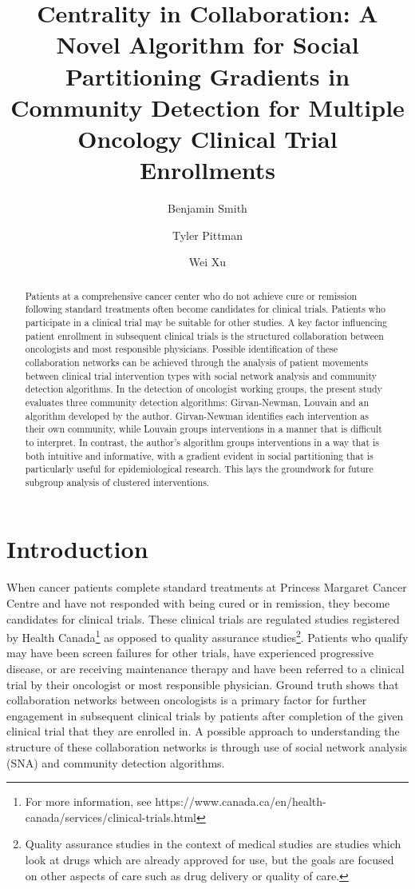 \documentclass{article}
\title{Centrality in Collaboration: A Novel Algorithm for Social Partitioning Gradients in Community Detection for Multiple Oncology Clinical Trial Enrollments}
\author[1]{Benjamin Smith\orcidlink{0009-0007-2206-0177}}
\author[2]{Tyler Pittman\orcidlink{0000-0002-5013-6980}}
\author[1,2]{Wei Xu\orcidlink{0000-0002-0257-8856}}
\affil[1]{University of Toronto, Toronto, Canada}
\affil[2]{University Health Network, Toronto, Canada}
\date{} %
\begin{document}
\maketitle

\begin{abstract}
Patients at a comprehensive cancer center who do not achieve cure
or remission following standard treatments often become candidates for
clinical trials. Patients who participate in a clinical trial may be
suitable for other studies. A key factor influencing patient enrollment
in subsequent clinical trials is the structured collaboration between
oncologists and most responsible physicians. Possible identification of
these collaboration networks can be achieved through the analysis of patient
movements between clinical trial intervention types with
social network analysis and community detection algorithms. In the detection of oncologist working groups, the
present study evaluates three community detection algorithms:
Girvan-Newman, Louvain and an algorithm developed by the author.
Girvan-Newman identifies each intervention as their own community, while
Louvain groups interventions in a manner that is difficult to interpret.
In contrast, the author's algorithm groups interventions in a way that
is both intuitive and informative, with a gradient evident in social partitioning that is particularly useful for epidemiological research. This lays the groundwork for future
subgroup analysis of clustered interventions.
\end{abstract}
\newpage
\section{Introduction}\label{introduction}

When cancer patients complete standard treatments at Princess Margaret
Cancer Centre and have not responded with being cured or in remission,
they become candidates for clinical trials. These clinical trials are
regulated studies registered by Health Canada\footnote{For more
  information, see
  https://www.canada.ca/en/health-canada/services/clinical-trials.html}
as opposed to quality assurance studies\footnote{Quality assurance
  studies in the context of medical studies are studies which look at
  drugs which are already approved for use, but the goals are focused on
  other aspects of care such as drug delivery or quality of care.}.
Patients who qualify may have been screen failures for other trials, have
experienced progressive disease, or are receiving maintenance therapy and
have been referred to a clinical trial by their oncologist or most
responsible physician. Ground truth shows that collaboration networks
between oncologists is a primary factor for further engagement in
subsequent clinical trials by patients after completion of the given
clinical trial that they are enrolled in. A possible approach to
understanding the structure of these collaboration networks is through
use of social network analysis (SNA) and community detection algorithms.
\end{document}

